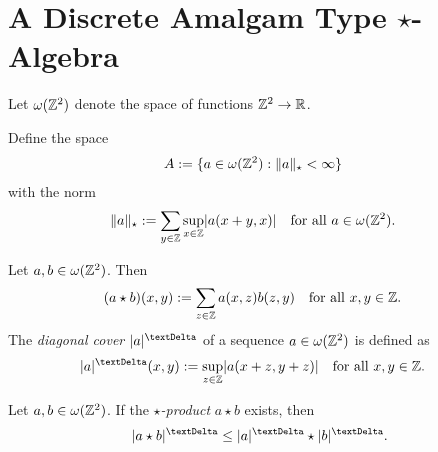 \section{A Discrete Amalgam Type $\star$-Algebra}
\label{lone}

Let $ \omega( \mathbb{ Z }^2 ) $ denote the space of functions $ \mathbb{ Z }^2 \to \mathbb{ R } $.

\begin{definition}
    Define the space
    \begin{align}
        A
        &:=
        \{   a \in \omega( \mathbb{ Z }^2 )  :  \lVert  a  \rVert_\star < \infty   \}
    \end{align}
    with the norm
    \begin{align}
        \lVert  a  \rVert_\star
        &:=
        \sum_{y\in\mathbb{ Z }}\sup_{x\in\mathbb{ Z }}\lvert a(x+y,x) \rvert
        &&\text{for all $ a \in \omega( \mathbb{ Z }^2 ) $.}
    \end{align}
\end{definition}

\begin{definition}
    Let $ a, b \in \omega( \mathbb{ Z }^2 ) $.
    Then
    \begin{align}
        ( a \star b )( x, y )
        &:=
        \sum_{z\in\mathbb{ Z }} a( x, z ) b( z, y )
        &&\text{for all $ x, y \in \mathbb{ Z } $.}
    \end{align}
    The {\em diagonal cover} $ \abs{a}^\tDe $
    of a sequence $ a \in \omega( \mathbb{ Z }^2 ) $ is defined as
    \begin{align}
        \abs{a}^\tDe( x, y )
        :=
        \sup_{z\in\nrZ}\abs{a(x+z,y+z)}
        &&&\text{for all $ x, y \in \nrZ $.}
    \end{align}
\end{definition}

\begin{lemma}
    \label{lem:sd}
    Let $ a, b \in \omega( \mathbb{ Z }^2 ) $.
    If the {\em $\star$-product} $ a \star b $ exists, then
    \begin{align}
        \absDi{ a \star b }
        \leq
        \absDi{ a } \star \absDi{ b }
        .
        \label{lem:sd:eq}
    \end{align}
\end{lemma}

